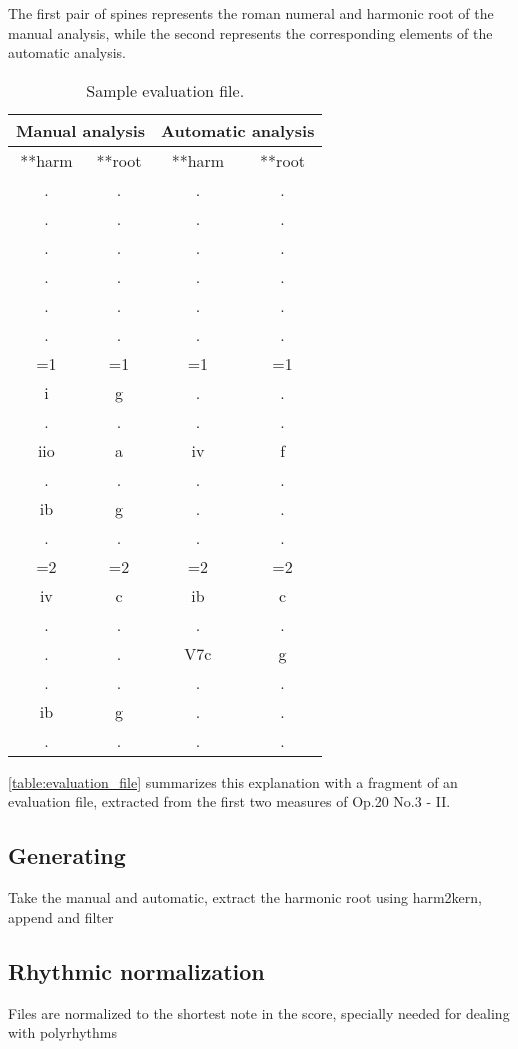 	The first pair of spines represents the roman numeral and harmonic root of the manual analysis, while the second represents the corresponding elements of the automatic analysis.

	\begin{table}[tbp]
	\centering
	\begin{tabular}{|cc|cc|}
	\hline
	\multicolumn{2}{|c|}{Manual analysis} & \multicolumn{2}{c|}{Automatic analysis} \\ \hline
	**harm & **root & **harm & **root \\
	. & . & . & . \\
	. & . & . & . \\
	. & . & . & . \\
	. & . & . & . \\
	. & . & . & . \\
	. & . & . & . \\
	=1 & =1 & =1 & =1 \\
	i & g & . & . \\
	. & . & . & . \\
	iio & a & iv & f \\
	. & . & . & . \\
	ib & g & . & . \\
	. & . & . & . \\
	=2 & =2 & =2 & =2 \\
	iv & c & ib & c \\
	. & . & . & . \\
	. & . & V7c & g \\
	. & . & . & . \\
	ib & g & . & . \\
	. & . & . & . \\ \hline
	\end{tabular}
	\caption{Sample evaluation file.}
	\label{table:evaluation_file}
	\end{table}

	\autoref{table:evaluation_file} summarizes this explanation with a fragment of an evaluation file, extracted from the first two measures of Op.20 No.3 - II.

  \subsection{Generating}
  Take the manual and automatic, extract the harmonic root using harm2kern, append and filter
  \subsection{Rhythmic normalization}
  Files are normalized to the shortest note in the score, specially needed for dealing with polyrhythms
